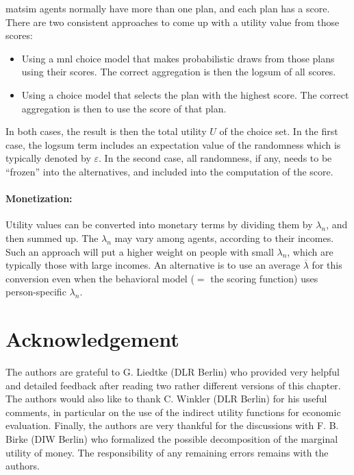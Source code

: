 \gls{matsim} agents normally have more than one plan, and each plan has a score.  There are two consistent approaches to come up with a utility value from those scores:
\begin{itemize}\styleItemize

\item Using a \gls{mnl} choice model that makes probabilistic draws from those plans using their scores. The correct aggregation is then the logsum of all scores.

\item Using a choice model that selects the plan with the highest score. The correct aggregation is then to use the score of that plan.

\end{itemize}
In both cases, the result is then the total utility $U$ of the choice set.  In the first case, the logsum term includes an expectation value of the randomness which is typically denoted by $\varepsilon$.  In the second case, all randomness, if any, needs to be ``frozen'' into the alternatives, and included into the computation of the score.

\paragraph*{Monetization:}

Utility values can be converted into monetary terms by dividing them by $\lambda_n$, and then summed up.
%
The $\lambda_n$ may vary among agents, \eg according to their incomes.  Such an approach will put a higher weight on people with small $\lambda_n$, which are typically those with large incomes.  An alternative is to use an average $\overline\lambda$ for this conversion even when the behavioral model ($=$ the scoring function) uses person-specific $\lambda_n$.

\section*{Acknowledgement}
The authors are grateful to G. Liedtke (DLR Berlin) who provided very helpful and detailed feedback after reading two rather different versions of this chapter.
%
The authors would also like to thank C. Winkler (DLR Berlin) for his useful comments, in particular on the use of the indirect utility functions for economic evaluation.
%
Finally, the authors are very thankful for the discussions with F. B. Birke (DIW Berlin) who formalized the possible decomposition of the marginal utility of money.
%
The responsibility of any remaining errors remains with the authors.


